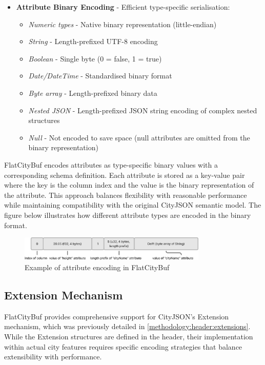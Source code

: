 \begin{itemize}
  \item \textbf{Attribute Binary Encoding} - Efficient type-specific serialisation:
    \begin{itemize}
      \item \textit{Numeric types} - Native binary representation (little-endian)
      \item \textit{String} - Length-prefixed UTF-8 encoding
      \item \textit{Boolean} - Single byte (0 = false, 1 = true)
      \item \textit{Date/DateTime} - Standardised binary format
      \item \textit{Byte array} - Length-prefixed binary data
      \item \textit{Nested JSON} - Length-prefixed JSON string encoding of complex nested structures
      \item \textit{Null} - Not encoded to save space (null attributes are omitted from the binary representation)
    \end{itemize}
\end{itemize}

FlatCityBuf encodes attributes as type-specific binary values with a corresponding schema definition. Each attribute is stored as a key-value pair where the key is the column index and the value is the binary representation of the attribute. This approach balances flexibility with reasonable performance while maintaining compatibility with the original CityJSON semantic model. The figure below illustrates how different attribute types are encoded in the binary format.

\begin{figure}[htbp]
  \centering
  \includegraphics[width=0.8\textwidth]{figs/methodology/attribute_structure.png}
  \caption{Example of attribute encoding in FlatCityBuf}
  \label{methodology:feature_encoding:attribute_encoding:figure}
\end{figure}

\subsection{Extension Mechanism}
\label{methodology:feature_encoding:extension_mechanism}

FlatCityBuf provides comprehensive support for CityJSON's Extension mechanism, which was previously detailed in \autoref{methodology:header:extensions}. While the Extension structures are defined in the header, their implementation within actual city features requires specific encoding strategies that balance extensibility with performance.


